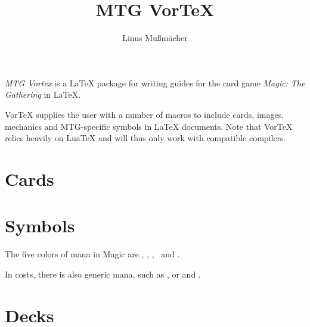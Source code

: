 \documentclass[a4paper]{scrartcl}
\title{MTG VorTeX}
\author{Linus Mußmächer}
\begin{document}
	\maketitle

	\emph{MTG Vortex} is a \LaTeX{} package for writing guides for the card game \emph{Magic: The Gathering} in \LaTeX{}.

	VorTeX supplies the user with a number of macros to include cards, images, mechanics and MTG-specific symbols in \LaTeX{} documents.
	Note that VorTeX relies heavily on LuaTeX and will thus only work with compatible compilers.

	\section{Cards}

	\section{Symbols}
	The five colors of mana in Magic are \mtgwhite, \mtgblue, \mtgblack, \mtgred\ and \mtggreen .

	In costs, there is also generic mana, such as ,  or  and .

	\section{Decks}
\end{document}

